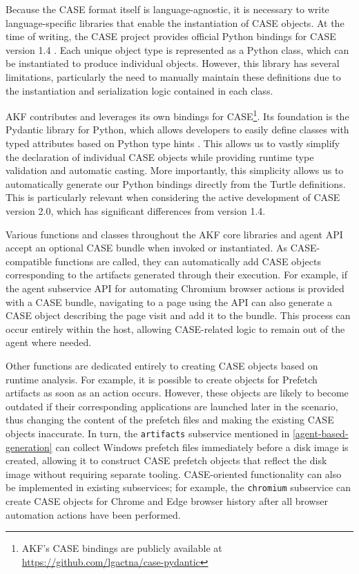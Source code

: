 \documentclass[final,5p,times,twocolumn]{elsarticle}
\newcommand{\passthrough}[1]{#1}
\begin{document}
Because the CASE format itself is language-agnostic, it is necessary to
write language-specific libraries that enable the instantiation of CASE
objects. At the time of writing, the CASE project provides official
Python bindings for CASE version 1.4
\cite{CaseworkCASEMappingPython}. Each unique object type is
represented as a Python class, which can be instantiated to produce
individual objects. However, this library has several limitations,
particularly the need to manually maintain these definitions due to the
instantiation and serialization logic contained in each class.

AKF contributes and leverages its own bindings for CASE\footnote{AKF's
  CASE bindings are publicly available at
  \url{https://github.com/lgactna/case-pydantic}}. Its foundation is the
Pydantic library for Python, which allows developers to easily define
classes with typed attributes based on Python type hints
\cite{colvinPydantic2024}. This allows us to vastly simplify the
declaration of individual CASE objects while providing runtime type
validation and automatic casting. More importantly, this simplicity
allows us to automatically generate our Python bindings directly from
the Turtle definitions. This is particularly relevant when considering
the active development of CASE version 2.0, which has significant
differences from version 1.4.

Various functions and classes throughout the AKF core libraries and
agent API accept an optional CASE bundle when invoked or instantiated.
As CASE-compatible functions are called, they can automatically add CASE
objects corresponding to the artifacts generated through their
execution. For example, if the agent subservice API for automating
Chromium browser actions is provided with a CASE bundle, navigating to a
page using the API can also generate a CASE object describing the page
visit and add it to the bundle. This process can occur entirely within
the host, allowing CASE-related logic to remain out of the agent where
needed.

Other functions are dedicated entirely to creating CASE objects based on
runtime analysis. For example, it is possible to create objects for
Prefetch artifacts as soon as an action occurs. However, these objects
are likely to become outdated if their corresponding applications are
launched later in the scenario, thus changing the content of the
prefetch files and making the existing CASE objects inaccurate. In turn,
the \passthrough{\lstinline!artifacts!} subservice mentioned in
\autoref{agent-based-generation} can collect Windows prefetch
files immediately before a disk image is created, allowing it to
construct CASE prefetch objects that reflect the disk image without
requiring separate tooling. CASE-oriented functionality can also be
implemented in existing subservices; for example, the
\passthrough{\lstinline!chromium!} subservice can create CASE objects
for Chrome and Edge browser history after all browser automation actions
have been performed.
\end{document}
